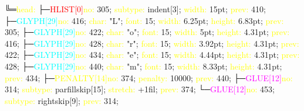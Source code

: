 \documentclass{article}
\begin{document}
\begin{nodetreeexample}
  \space\space╚═\textcolor{yellow}{head:}\newline
  \space\space\space\space├─\textcolor{red}{HLIST[0]\space}\textcolor{yellow}{no:} 305; \textcolor{yellow}{subtype:} indent[3]; \textcolor{yellow}{width:} 15pt; \textcolor{yellow}{prev:} 410; \newline
  \space\space\space\space├─\textcolor{cyan}{GLYPH[29]\space}\textcolor{yellow}{no:} 416; \textcolor{yellow}{char:} "L"; \textcolor{yellow}{font:} 15; \textcolor{yellow}{width:} 6.25pt; \textcolor{yellow}{height:} 6.83pt; \textcolor{yellow}{prev:} 305; \newline
  \space\space\space\space├─\textcolor{cyan}{GLYPH[29]\space}\textcolor{yellow}{no:} 422; \textcolor{yellow}{char:} "o"; \textcolor{yellow}{font:} 15; \textcolor{yellow}{width:} 5pt; \textcolor{yellow}{height:} 4.31pt; \textcolor{yellow}{prev:} 416; \newline
  \space\space\space\space├─\textcolor{cyan}{GLYPH[29]\space}\textcolor{yellow}{no:} 428; \textcolor{yellow}{char:} "r"; \textcolor{yellow}{font:} 15; \textcolor{yellow}{width:} 3.92pt; \textcolor{yellow}{height:} 4.31pt; \textcolor{yellow}{prev:} 422; \newline
  \space\space\space\space├─\textcolor{cyan}{GLYPH[29]\space}\textcolor{yellow}{no:} 434; \textcolor{yellow}{char:} "e"; \textcolor{yellow}{font:} 15; \textcolor{yellow}{width:} 4.44pt; \textcolor{yellow}{height:} 4.31pt; \textcolor{yellow}{prev:} 428; \newline
  \space\space\space\space├─\textcolor{cyan}{GLYPH[29]\space}\textcolor{yellow}{no:} 440; \textcolor{yellow}{char:} "m"; \textcolor{yellow}{font:} 15; \textcolor{yellow}{width:} 8.33pt; \textcolor{yellow}{height:} 4.31pt; \textcolor{yellow}{prev:} 434; \newline
  \space\space\space\space├─\textcolor{yellow}{PENALTY[14]\space}\textcolor{yellow}{no:} 374; \textcolor{yellow}{penalty:} 10000; \textcolor{yellow}{prev:} 440; \newline
  \space\space\space\space├─\textcolor{magenta}{GLUE[12]\space}\textcolor{yellow}{no:} 314; \textcolor{yellow}{subtype:} parfillskip[15]; \textcolor{yellow}{stretch:} +1fil; \textcolor{yellow}{prev:} 374; \newline
  \space\space\space\space└─\textcolor{magenta}{GLUE[12]\space}\textcolor{yellow}{no:} 453; \textcolor{yellow}{subtype:} rightskip[9]; \textcolor{yellow}{prev:} 314; \newline

\end{nodetreeexample}
\end{document}
